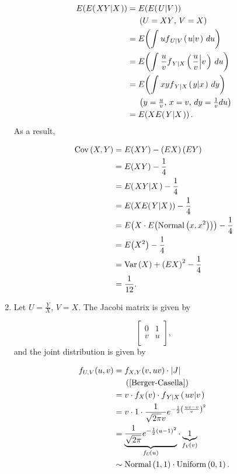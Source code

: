 \documentclass[12pt,letterpaper,reqno]{amsart}
\numberwithin{equation}{subsection}
\begin{document}
\begin{enumerate}[label=(\alph*),leftmargin=*]
\begin{align}
    \fun{E}{\fun{E}{\conditbar{XY}{X}}} &= \fun{E}{\fun{E}{\conditbar{U}{V}}} \nonumber \\
    & \ \ \ \ \left( \mbox{$U = XY$, $V = X$} \right) \nonumber \\
    &= \fun{E}{\myint{u \fun{f_{\conditbar{U}{V}}}{\conditbar{u}{v}}}{u}{}{}} \nonumber \\
    &= \fun{E}{\myint{\frac{u}{v} \fun{f_{\conditbar{Y}{X}}}{\conditbar{\frac{u}{v}}{v}}}{u}{}{}} \nonumber \\
    &= \fun{E}{\myint{xy \fun{f_{\conditbar{Y}{X}}}{\conditbar{y}{x}}}{y}{}{}} \nonumber \\
    & \ \ \ \ \left( \mbox{$y = \frac{u}{v}$, $x = v$, $dy = \frac{1}{v} du$} \right) \nonumber \\
    &= \fun{E}{X\fun{E}{\conditbar{Y}{X}}}.
\end{align}
As a result,

\begin{align*}
    \Cov{X,Y} &= \fun{E}{XY} - \left( EX \right) \left( EY \right) \\
    &= \fun{E}{XY} - \frac{1}{4} \\
    &= \fun{E}{\conditbar{XY}{X}} - \frac{1}{4} \\
    &= \fun{E}{X\fun{E}{\conditbar{Y}{X}}} - \frac{1}{4} \\
    &= \fun{E}{X \cdot \fun{E}{\normaldist{x, x^2}}} - \frac{1}{4} \\
    &= \fun{E}{X^2} - \frac{1}{4} \\
    &= \Var{X} + \left( EX \right)^2 - \frac{1}{4} \\
    &= \frac{1}{12}.
\end{align*}

\item Let $U = \frac{Y}{X}$, $V = X$. The Jacobi matrix is given by

\[ \left[ \begin{array}{cc}
     0 & 1 \\
     v & u \\
\end{array} \right], \]
and the joint distribution is given by

\begin{align*}
    \fun{f_{U,V}}{u,v} &= \fun{f_{X,Y}}{v, uv} \cdot \Abs{J} \\
    & \ \ \ \ \left( \mbox{\cite[page 158]{Berger-Casella}} \right) \\
    &= v \cdot \fun{f_X}{v} \cdot \fun{f_{\conditbar{Y}{X}}}{\conditbar{uv}{v}} \\
    &= v \cdot 1 \cdot \Gaussianpdf{\frac{uv-v}{v}}{v} \\
    &= \underbrace{\Gaussianpdf{u-1}{}}_{\fun{f_U}{u}} \cdot \underbrace{1}_{\fun{f_V}{v}} \\
    &\sim \normaldist{1,1} \cdot \uniformdist{0,1}.
\end{align*}
\end{enumerate}

\newpage
\nocite{*}
\printbibliography
\end{document}
